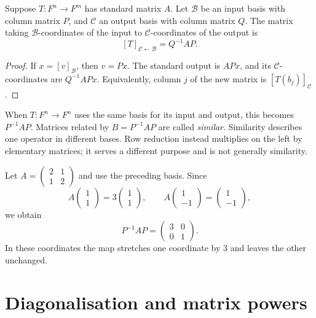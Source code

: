 \begin{theorem}
Suppose $T:F^n\to F^m$ has standard matrix $A$.
Let $\mathcal B$ be an input basis with column matrix $P$, and
$\mathcal C$ an output basis with column matrix $Q$.
The matrix taking $\mathcal B$-coordinates of the input to
$\mathcal C$-coordinates of the output is
\[
 \boxed{[T]_{\mathcal C\leftarrow\mathcal B}=Q^{-1}AP.}
\]
\end{theorem}
\begin{proof}
If $x=[v]_{\mathcal B}$, then $v=Px$.
The standard output is $APx$, and its $\mathcal C$-coordinates are
$Q^{-1}APx$. Equivalently, column $j$ of the new matrix is
$[T(b_j)]_{\mathcal C}$.
\end{proof}

When $T:F^n\to F^n$ uses the same basis for its input and output, this
becomes $P^{-1}AP$.
Matrices related by $B=P^{-1}AP$ are called \emph{similar}.
Similarity describes one operator in different bases.
Row reduction instead multiplies on the left by elementary matrices;
it serves a different purpose and is not generally similarity.

\begin{example}
Let $A=\begin{pmatrix}2&1\\1&2\end{pmatrix}$ and use the preceding basis.
Since
\[
 A\begin{pmatrix}1\\1\end{pmatrix}
 =3\begin{pmatrix}1\\1\end{pmatrix},\qquad
 A\begin{pmatrix}1\\-1\end{pmatrix}
 =\begin{pmatrix}1\\-1\end{pmatrix},
\]
we obtain
\[
 P^{-1}AP=\begin{pmatrix}3&0\\0&1\end{pmatrix}.
\]
In these coordinates the map stretches one coordinate by $3$ and leaves
the other unchanged.
\end{example}

\section{Diagonalisation and matrix powers}

